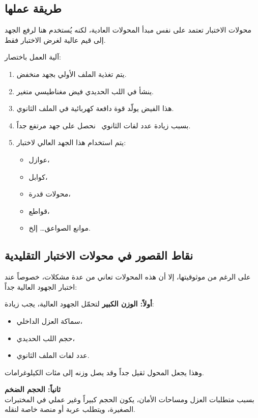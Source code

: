 \documentclass[a4paper, 14pt]{extarticle} %
\begin{document}
    \subsection{طريقة عملها}
    محولات الاختبار تعتمد على نفس مبدأ المحولات العادية، لكنه يُستخدم هنا لرفع الجهد إلى قيم عالية لغرض الاختبار فقط.\\
    \vspace{5pt}

    آلية العمل باختصار:
    \begin{enumerate}
      \item يتم تغذية الملف الأولي بجهد منخفض.
      \item ينشأ في اللب الحديدي فيض مغناطيسي متغير.
      \item هذا الفيض يولّد قوة دافعة كهربائية في الملف الثانوي.
      \item{ 
      بسبب زيادة عدد لفات الثانوي
      \leftarrow \,
      نحصل على جهد مرتفع جداً.
      }
      \item يتم استخدام هذا الجهد العالي لاختبار:
        \begin{itemize}
          \item عوازل،
          \item كوابل،
          \item محولات قدرة،
          \item قواطع،
          \item موانع الصواعق… إلخ.
        \end{itemize}
    \end{enumerate}
    \subsection{نقاط القصور في محولات الاختبار التقليدية}
    على الرغم من موثوقيتها، إلا أن هذه المحولات تعاني من عدة مشكلات، خصوصاً عند اختبار الجهود العالية جداً:\\
    \vspace{5pt}
    
    \textbf{أولاً: الوزن الكبير}
    لتحمّل الجهود العالية، يجب زيادة:
    \begin{itemize}
      \item
      سماكة العزل الداخلي،
      \item
      حجم اللب الحديدي،
      \item 
      عدد لفات الملف الثانوي.
    \end{itemize}
    وهذا يجعل المحول ثقيل جداً وقد يصل وزنه إلى مئات الكيلوغرامات.
    
    \vspace{8pt}
    \textbf{ثانياً: الحجم الضخم}\\
    بسبب متطلبات العزل ومساحات الأمان، يكون الحجم كبيراً وغير عملي في المختبرات الصغيرة، ويتطلب عربة أو منصة خاصة لنقله.
    
\end{document}
